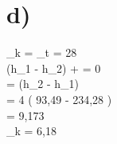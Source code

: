 

\section*{d)}
 \quad {}_k =  \quad {} \quad {}_t = 28 \,  \\

   \quad {} (h_1 - h_2) +  = 0 \\
 =  (h_2 - h_1) \\
\Rightarrow {} = 4  \cdot {} \left( 93,49 - 234,28 \right) \\
\Rightarrow {} = 9,173 \,  \\

\Rightarrow {}_k = 6,18 \\